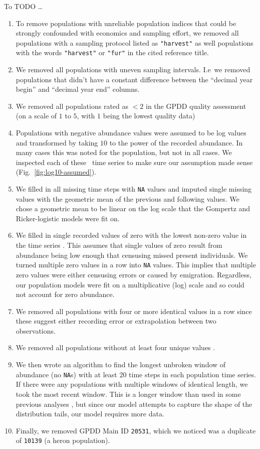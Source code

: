 \documentclass[12pt]{article}
\begin{document}
To TODO \ldots

\begin{enumerate}

\item To remove populations with unreliable population indices that could be strongly confounded with economics and sampling effort, we removed all populations with a sampling protocol listed as \texttt{"harvest"} as well populations with the words \texttt{"harvest"} or \texttt{"fur"} in the cited reference title.
\item We removed all populations with uneven sampling intervals. I.e\ we removed populations that didn't have a constant difference between the ``decimal year begin'' and ``decimal year end'' columns.
\item We removed all populations rated as $< 2$ in the GPDD quality assessment (on a scale of $1$ to $5$, with $1$ being the lowest quality data) \citep[following][]{sibly2005, ziebarth2010}
\item Populations with negative abundance values were assumed to be log values and transformed by taking $10$ to the power of the recorded abundance. In many cases this was noted for the population, but not in all cases. We inspected each of these  \totalAssumedLog\ time series to make sure our assumption made sense (Fig.~\ref{fig:log10-assumed}).
\item We filled in all missing time steps with \texttt{NA} values and imputed single missing values with the geometric mean of the previous and following values. We chose a geometric mean to be linear on the log scale that the Gompertz and Ricker-logistic models were fit on.
\item We filled in single recorded values of zero with the lowest non-zero value in the time series \citep[following][]{brook2006a}. This assumes that single values of zero result from abundance being low enough that censusing missed present individuals. We turned multiple zero values in a row into \texttt{NA} values. This implies that multiple zero values were either censusing errors or caused by emigration. Regardless, our population  models were fit on a multiplicative (log) scale and so could not account for zero abundance.
\item We removed all populations with four or more identical values in a row since these suggest either recording error or extrapolation between two observations.
\item We removed all populations without at least four unique values \citep[following][]{brook2006a}.
\item We then wrote an algorithm to find the longest unbroken window of abundance (no \texttt{NA}s) with at least 20 time steps in each population time series.  If there were any populations with multiple windows of identical length, we took the most recent window. This is a longer window than used in some previous analyses \citep[e.g.][]{brook2006a}, but since our model attempts to capture the shape of the distribution tails, our model requires more data.
\item Finally, we removed GPDD Main ID \texttt{20531}, which we noticed was a duplicate of \texttt{10139} (a heron population).
\end{enumerate}
\end{document}
